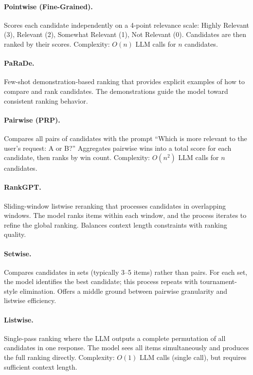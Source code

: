 \paragraph{Pointwise (Fine-Grained).}
Scores each candidate independently on a 4-point relevance scale: Highly Relevant (3), Relevant (2), Somewhat Relevant (1), Not Relevant (0).
Candidates are then ranked by their scores.
Complexity: $O(n)$ LLM calls for $n$ candidates.

\paragraph{PaRaDe.}
Few-shot demonstration-based ranking that provides explicit examples of how to compare and rank candidates.
The demonstrations guide the model toward consistent ranking behavior.

\paragraph{Pairwise (PRP).}
Compares all pairs of candidates with the prompt ``Which is more relevant to the user's request: A or B?''
Aggregates pairwise wins into a total score for each candidate, then ranks by win count.
Complexity: $O(n^2)$ LLM calls for $n$ candidates.

\paragraph{RankGPT.}
Sliding-window listwise reranking that processes candidates in overlapping windows.
The model ranks items within each window, and the process iterates to refine the global ranking.
Balances context length constraints with ranking quality.

\paragraph{Setwise.}
Compares candidates in sets (typically 3--5 items) rather than pairs.
For each set, the model identifies the best candidate; this process repeats with tournament-style elimination.
Offers a middle ground between pairwise granularity and listwise efficiency.

\paragraph{Listwise.}
Single-pass ranking where the LLM outputs a complete permutation of all candidates in one response.
The model sees all items simultaneously and produces the full ranking directly.
Complexity: $O(1)$ LLM calls (single call), but requires sufficient context length.

